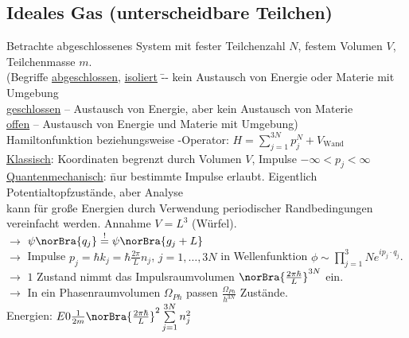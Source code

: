 \subsection{Ideales Gas (unterscheidbare Teilchen)}
\begin{tabbing}
Betrachte abgeschlossenes System mit fester Teilchenzahl $N$, festem Volumen $V$, Teilchenmasse $m$.\\
(Begriffe \= \uline{abgeschlossen}, \uline{isoliert} \= -- kein Austausch von Energie oder Materie mit Umgebung\\
\>\uline{geschlossen}\> -- Austausch von Energie, aber kein Austausch von Materie\\
\>\uline{offen}\> -- Austausch von Energie und Materie mit Umgebung)\\
Hamiltonfunktion beziehungsweise -Operator: $H = \sum\limits_{j=1}^{3N} p_j^N + V_\text{Wand}$\\
\uline{Klassisch}: Koordinaten begrenzt durch Volumen $V$, Impulse $-\infty < p_j < \infty$\\
\uline{Quantenmechanisch}: \=nur bestimmte Impulse erlaubt. Eigentlich Potentialtopfzustände, aber Analyse\\\> kann für große Energien durch Verwendung periodischer Randbedingungen\\\> vereinfacht werden. Annahme $V = L^3$ (Würfel).\\
$\rightarrow$\> $\psi\norBra{q_j} \stackrel{!}{=} \psi\norBra{g_j + L}$\\
$\rightarrow$\> Impulse $p_j = \hbar k_j = \hbar \frac{2\pi}{L} n_j$, $j = 1, \dots, 3N$ in Wellenfunktion $\phi \sim \prod\limits_{j=1}^3N e^{i p_j\cdot q_j}$.\\
$\rightarrow$\> $1$ Zustand nimmt das Impulsraumvolumen $\norBra{\frac{2\pi\hbar}{L}}^{3N}$ ein.\\
$\rightarrow$\> In ein Phasenraumvolumen $\Omega_{Ph}$ passen $\frac{\Omega_{Ph}}{h^{3N}}$ Zustände.\\
\> Energien: $E 0 \frac{1}{2 m} \norBra{\frac{2\pi\hbar}{L}}^2 \sum\limits_{j=1}^{3N} n_j^2$
\end{tabbing}
\begin{figure}[H]
  \centering
\end{figure}



